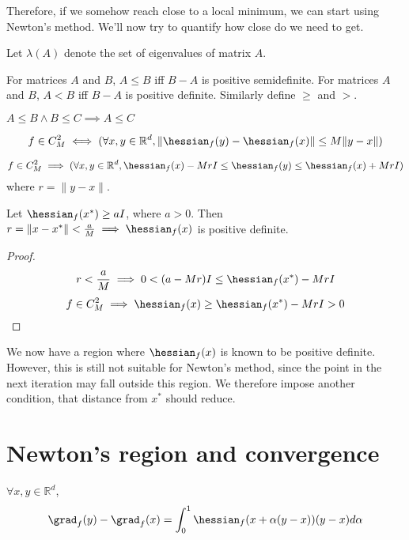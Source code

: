 Therefore, if we somehow reach close to a local minimum, we can start using Newton's method.
We'll now try to quantify how close do we need to get.

\begin{definition}
Let $\lambda(A)$ denote the set of eigenvalues of matrix $A$.
\end{definition}
\begin{definition}
For matrices $A$ and $B$, $A \le B$ iff $B-A$ is positive semidefinite.
For matrices $A$ and $B$, $A < B$ iff $B-A$ is positive definite.
Similarly define $\ge$ and $>$.
\end{definition}
\begin{theorem}
$A \le B \wedge B \le C \implies A \le C$
\end{theorem}
\begin{definition}
\[ f \in C^2_M \iff (\forall x, y \in \mathbb{R}^d, \| \hessian_f(y) - \hessian_f(x) \| \le M \|y - x\|) \]
\end{definition}
\begin{theorem}[Homework]
\[ f \in C^2_M \implies (\forall x, y \in \mathbb{R}^d,
\hessian_f(x) - MrI \le \hessian_f(y) \le \hessian_f(x) + MrI) \]
where $r = \|y-x\|$.
\end{theorem}

\begin{theorem}
Let $\hessian_f(x^*) \ge aI$, where $a > 0$.
Then $r = \|x - x^*\| < \frac{a}{M} \implies \hessian_f(x)$ is positive definite.
\end{theorem}
\begin{proof}
\[ r < \frac{a}{M} \implies 0 < (a - Mr)I \le \hessian_f(x^*) - MrI \]
\[ f \in C^2_M \implies \hessian_f(x) \ge \hessian_f(x^*) - MrI > 0 \]
\end{proof}

We now have a region where $\hessian_f(x)$ is known to be positive definite.
However, this is still not suitable for Newton's method,
since the point in the next iteration may fall outside this region.
We therefore impose another condition, that distance from $x^*$ should reduce.

\section{Newton's region and convergence}

\begin{lemma} \label{thm:hessian-integral}
$\forall x, y \in \mathbb{R}^d$,
\[ \grad_f(y) - \grad_f(x) = \int_0^1 \hessian_f(x + \alpha(y-x)) (y-x) d\alpha \]
\end{lemma}

